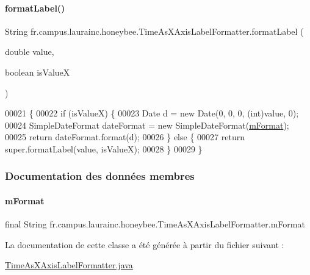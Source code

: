 \paragraph{\texorpdfstring{format\+Label()}{formatLabel()}}
{\footnotesize\ttfamily String fr.\+campus.\+laurainc.\+honeybee.\+Time\+As\+X\+Axis\+Label\+Formatter.\+format\+Label (\begin{DoxyParamCaption}\item[{double}]{value,  }\item[{boolean}]{is\+ValueX }\end{DoxyParamCaption})}


\begin{DoxyCode}
00021                                                               \{
00022         \textcolor{keywordflow}{if} (isValueX) \{
00023             Date d = \textcolor{keyword}{new} Date(0, 0, 0, (\textcolor{keywordtype}{int})value, 0);
00024             SimpleDateFormat dateFormat = \textcolor{keyword}{new} SimpleDateFormat(\hyperlink{classfr_1_1campus_1_1laurainc_1_1honeybee_1_1_time_as_x_axis_label_formatter_ab6093f1dff2db01144543e00bb1b2700}{mFormat});
00025             \textcolor{keywordflow}{return} dateFormat.format(d);
00026         \} \textcolor{keywordflow}{else} \{
00027             \textcolor{keywordflow}{return} super.formatLabel(value, isValueX);
00028         \}
00029     \}
\end{DoxyCode}


\subsubsection{Documentation des données membres}
\mbox{\label{classfr_1_1campus_1_1laurainc_1_1honeybee_1_1_time_as_x_axis_label_formatter_ab6093f1dff2db01144543e00bb1b2700}} 
\paragraph{\texorpdfstring{m\+Format}{mFormat}}
{\footnotesize\ttfamily final String fr.\+campus.\+laurainc.\+honeybee.\+Time\+As\+X\+Axis\+Label\+Formatter.\+m\+Format\hspace{0.3cm}{\ttfamily [protected]}}



La documentation de cette classe a été générée à partir du fichier suivant \+:\begin{DoxyCompactItemize}
\item 
\hyperlink{_time_as_x_axis_label_formatter_8java}{Time\+As\+X\+Axis\+Label\+Formatter.\+java}\end{DoxyCompactItemize}
